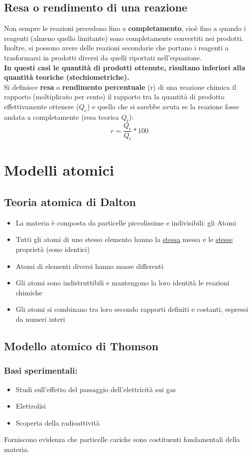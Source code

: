 \documentclass{book}
\begin{document}
\section{Resa o rendimento di una reazione}
Non sempre le reazioni precedono fino a \textbf{completamento}, cioè fino a quando i reagenti (almeno quello limitante) sono completamente convertiti nei prodotti. Inoltre, si possono avere delle reazioni secondarie che portano i reagenti a trasformarsi in prodotti diversi da quelli riportati nell'equazione.\\
\textbf{\color{red}In questi casi le quantità di prodotti ottenute, risultano inferiori alla quantità teoriche (stechiometriche).}\\
Si definisce \textbf{resa} o \textbf{rendimento percentuale} (r) di una reazione chimica il rapporto (moltiplicato per cento) il rapporto tra la quantità di prodotto effettivamente ottenere ($Q_e$) e quella che si sarebbe avuta se la reazione fosse andata a completamente (resa teorica $Q_t$):
\begin{equation}
	r=\frac{Q_e}{Q_t}*100
\end{equation}

\chapter{Modelli atomici}
\section{Teoria atomica di Dalton}
\begin{itemize}
\item La materia è composta da particelle piccolissime e indivisibili: gli Atomi
\item Tutti gli atomi di uno stesso elemento hanno la \underline{stessa} messa e le \underline{stesse} proprietà (sono identici)
\item Atomi di elementi diversi hanno masse differenti
\item Gli atomi sono indistruttibili e mantengono la loro identità le reazioni chimiche
\item Gli atomi si combinano tra loro secondo rapporti definiti e costanti, espressi da numeri interi
\end{itemize}
\section{Modello atomico di Thomson}
\subsection{Basi sperimentali:}
\begin{itemize}
\item Studi sull'effetto del passaggio dell'elettricità sui gas
\item Elettrolisi
\item Scoperta della radioattività
\end{itemize}
Forniscono evidenza che particelle cariche sono costituenti fondamentali della materia.
\end{document}
